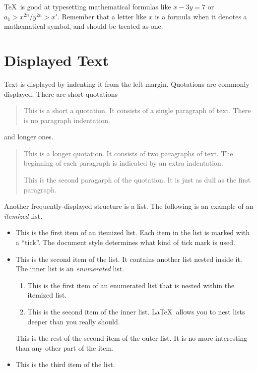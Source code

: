 \TeX\ is good at typesetting mathematical formulas like
       \( x-3y = 7 \) 
or
       \( a_{1} > x^{2n} / y^{2n} > x' \).
Remember that a letter like
       $x$        %
is a formula when it denotes a mathematical symbol, and should
be treated as one.

\section{Displayed Text}

Text is displayed by indenting it from the left margin.
Quotations are commonly displayed.  There are short quotations
\begin{quote}
   This is a short a quotation.  It consists of a 
   single paragraph of text.  There is no paragraph
   indentation.
\end{quote}
and longer ones.
\begin{quotation}
   This is a longer quotation.  It consists of two paragraphs
   of text.  The beginning of each paragraph is indicated
   by an extra indentation.

   This is the second paragarph of the quotation.  It is just
   as dull as the first paragraph.
\end{quotation}
Another frequently-displayed structure is a list.
The following is an example of an {\em itemized} list.
\begin{itemize}
   \item  This is the first item of an itemized list.  Each item 
          in the list is marked with a ``tick''.  The document
          style determines what kind of tick mark is used.

   \item  This is the second item of the list.  It contains another
          list nested inside it.  The inner list is an {\em enumerated}
          list.
          \begin{enumerate}
              \item This is the first item of an enumerated list that
                    is nested within the itemized list.

              \item This is the second item of the inner list.  \LaTeX\
                    allows you to nest lists deeper than you really should.
          \end{enumerate}
          This is the rest of the second item of the outer list.  It
          is no more interesting than any other part of the item.
   \item  This is the third item of the list.
\end{itemize}
